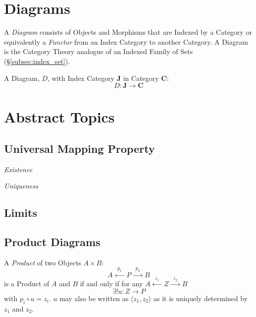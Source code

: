 \documentclass{article}
\begin{document}
\section{Diagrams}\label{sec:category_diagram}

A \emph{Diagram} consists of Objects and Morphisms that are Indexed by
a Category or equivalently a \emph{Functor} from an Index Category to
another Category. A Diagram is the Category Theory analogue of an
Indexed Family of Sets (\S\ref{subsec:index_set}).

A Diagram, $D$, with Index Category $\mathbf{J}$ in Category
$\mathbf{C}$:
\[
    D : \mathbf{J} \rightarrow \mathbf{C}
\]

\section{Abstract Topics}\label{sec:abstract_category}

\subsection{Universal Mapping Property}\label{subsec:universal_mapping_property}

\emph{Existence}

\emph{Uniqueness}

\subsection{Limits}\label{subsec:category_limits}



\subsection{Product Diagrams}\label{subsec:product_diagram}

A \emph{Product} of two Objects $A \times B$:
\[
    A \xleftarrow{\;\;p_1\;\;} P \xrightarrow{\;\;p_2\;\;} B
\]
is a Product of $A$ and $B$ if and only if for any $A
\xleftarrow{\;\;z_1\;\;} Z \xrightarrow{\;\;z_2\;\;} B$
\[
    \exists!u : Z \rightarrow P
\]
with $p_i \circ u = z_i$. $u$ may also be written as $\langle z_1, z_2
\rangle$ as it is uniquely determined by $z_1$ and $z_2$.
\end{document}
